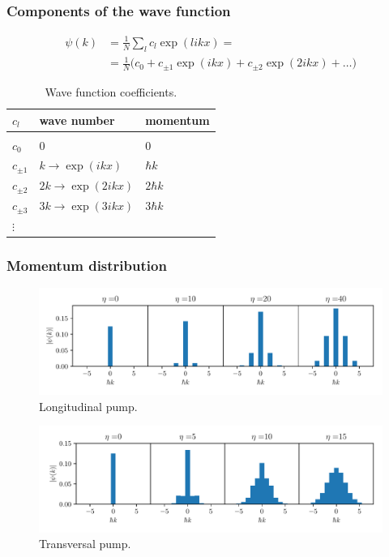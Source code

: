 \documentclass[pdflatex,compress]{beamer}
\begin{document}
\begin{frame}
\frametitle{Components of the wave function}
\vspace{-3em}
\begin{align}
\psi(k) & = \frac{1}{N} \sum_l c_l \exp(likx) =  \\
& = \frac{1}{N} \Big( c_0 + c_{\pm 1} \exp(ikx) + c_{\pm 2} \exp(2ikx) + \dots \Big) \nonumber
\end{align}
\vspace{-1em}
\begin{table}[!htb]
\centering
\begin{tabular}{lll}
$c_l$    & wave number & momentum    \\
\hline \\
$c_0$    & 0           & 0           \\
$c_{\pm 1}$ & $k \rightarrow \exp(ikx)$         & $\hbar k$   \\
$c_{\pm 2}$ & $2k \rightarrow \exp(2ikx)$        & $2 \hbar k$ \\
$c_{\pm 3}$ & $3k \rightarrow \exp(3ikx)$        & $3 \hbar k$ \\
$\vdots$ &             &            
\end{tabular}
\caption{Wave function coefficients.}
\end{table}
\end{frame}

\begin{frame}
\frametitle{Momentum distribution}
\vspace{-1em}
\begin{figure}
\centering
\includegraphics[width=.9\textwidth]{images/mom_long.pdf}
\vspace*{-6mm}
\caption{Longitudinal pump.}
\end{figure}
\vspace{-2em}
\begin{figure}
\centering
\includegraphics[width=.9\textwidth]{images/mom_trans.pdf}
\vspace*{-6mm}
\caption{Transversal pump.}
\end{figure}
\end{frame}
\end{document}
